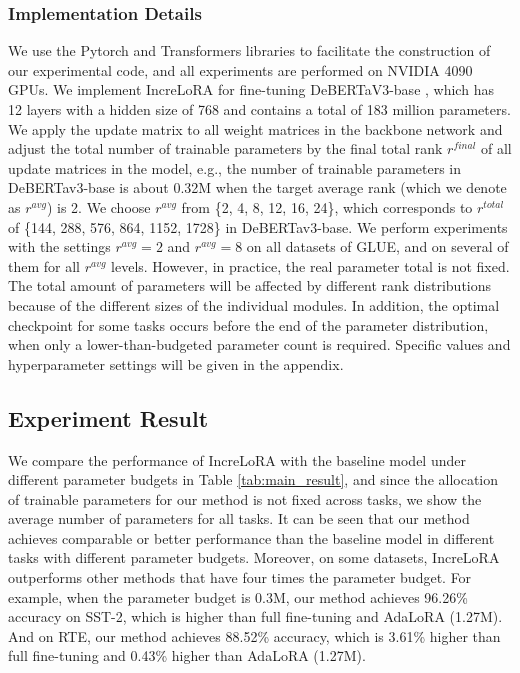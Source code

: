 \subsubsection{Implementation Details} We use the Pytorch \cite{e:5} and Transformers \cite{e:6} libraries to facilitate the construction of our experimental code, and all experiments are performed on NVIDIA 4090 GPUs. We implement IncreLoRA for fine-tuning DeBERTaV3-base \cite{e:3}, which has 12 layers with a hidden size of 768 and contains a total of 183 million parameters. We apply the update matrix to all weight matrices in the backbone network and adjust the total number of trainable parameters by the final total rank $r^{final}$ of all update matrices in the model, e.g., the number of trainable parameters in DeBERTav3-base is about 0.32M when the target average rank (which we denote as $r^{avg}$) is 2. We choose $r^{avg}$ from \{2, 4, 8, 12, 16, 24\}, which corresponds to $r^{total}$ of \{144, 288, 576, 864, 1152, 1728\} in DeBERTav3-base. We perform experiments with the settings $r^{avg} = 2$ and $r^{avg} = 8$ on all datasets of GLUE, and on several of them for all $r^{avg}$ levels. However, in practice, the real parameter total is not fixed. The total amount of parameters will be affected by different rank distributions because of the different sizes of the individual modules. In addition, the optimal checkpoint for some tasks occurs before the end of the parameter distribution, when only a lower-than-budgeted parameter count is required. Specific values and hyperparameter settings will be given in the appendix. 

\subsection{Experiment Result} We compare the performance of IncreLoRA with the baseline model under different parameter budgets in Table \ref{tab:main_result}, and since the allocation of trainable parameters for our method is not fixed across tasks, we show the average number of parameters for all tasks. It can be seen that our method achieves comparable or better performance than the baseline model in different tasks with different parameter budgets. Moreover, on some datasets, IncreLoRA outperforms other methods that have four times the parameter budget. For example, when the parameter budget is 0.3M, our method achieves 96.26\% accuracy on SST-2, which is higher than full fine-tuning and AdaLoRA (1.27M). And on RTE, our method achieves 88.52\% accuracy, which is 3.61\% higher than full fine-tuning and 0.43\% higher than AdaLoRA (1.27M). 

